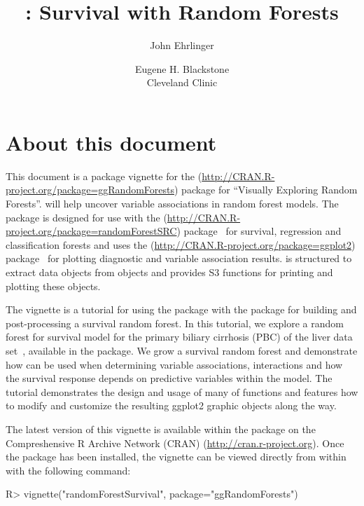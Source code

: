 \documentclass[nojss]{jss}\usepackage[]{graphicx}\usepackage[]{color}
\author{John Ehrlinger 
\and Eugene H. Blackstone\\Cleveland Clinic}
\title{\pkg{ggRandomForests}: Survival with Random Forests}
\begin{document}
\section*{About this document}

This document is a package vignette for the  (\url{http://CRAN.R-project.org/package=ggRandomForests}) package for ``Visually Exploring Random Forests''.  will help uncover variable associations in random forest models. The package is designed for use with the  (\url{http://CRAN.R-project.org/package=randomForestSRC}) package~\citep{Ishwaran:RFSRC:2014} for survival, regression and classification forests and uses the (\url{http://CRAN.R-project.org/package=ggplot2}) package~\citep{Wickham:2009} for plotting diagnostic and variable association results.  is  structured to extract data objects from  objects and provides S3 functions for printing and plotting these objects.

The vignette is a tutorial for using the  package with the  package for building and post-processing a survival random forest. In this tutorial, we explore a random forest for survival model for the primary biliary cirrhosis (PBC) of the liver data set~\citep{fleming:1991}, available in the  package. We grow a survival random forest and demonstrate how  can be used when determining variable associations, interactions and how the survival response depends on predictive variables within the model. The tutorial demonstrates the design and usage of many of  functions and features how to modify and customize the resulting ggplot2 graphic objects along the way.

The latest version of this vignette is available within the  package on the Compreshensive R Archive Network (CRAN) (\url{http://cran.r-project.org}). Once the package has been installed, the vignette can be viewed directly from within  with the following command:
\begin{Schunk}
\begin{Sinput}
R> vignette("randomForestSurvival", package="ggRandomForests")
\end{Sinput}
\end{Schunk}
\end{document}
